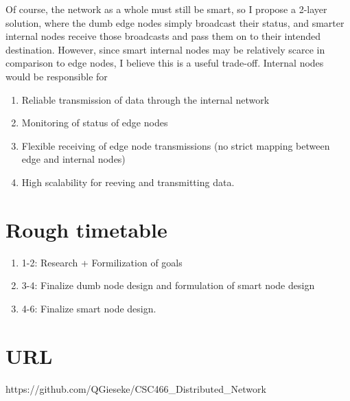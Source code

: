 \documentclass{article}
\begin{document}
Of course, the network as a whole must still be smart, so I propose a 2-layer solution, where the dumb edge nodes simply broadcast their status, and smarter internal nodes receive those broadcasts and pass them on to their intended destination. However, since smart internal nodes may be relatively scarce in comparison to edge nodes, I believe this is a useful trade-off. Internal nodes would be responsible for
\begin{enumerate}
	\item Reliable transmission of data through the internal network
	\item Monitoring of status of edge nodes
	\item Flexible receiving of edge node transmissions (no strict mapping between edge and internal nodes)
	\item High scalability for reeving and transmitting data.
\end{enumerate}

\section{Rough timetable}

\begin{enumerate}
	\item 1-2: Research + Formilization of goals
	\item 3-4: Finalize dumb node design and formulation of smart node design
	\item 4-6: Finalize smart node design.
\end{enumerate}

\section{URL}
https://github.com/QGieseke/CSC466\_Distributed\_Network
\end{document}
